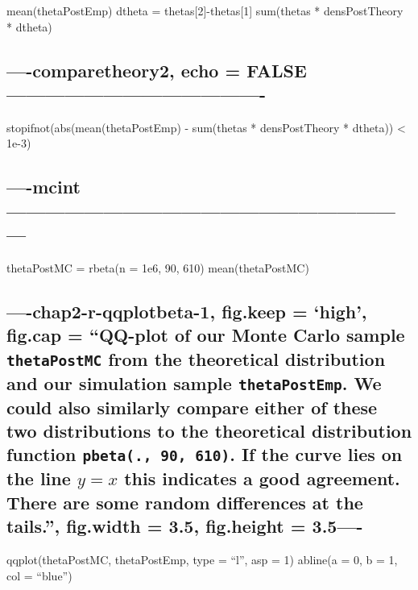 \documentclass[]{article}
\begin{document}
mean(thetaPostEmp) dtheta = thetas{[}2{]}-thetas{[}1{]} sum(thetas *
densPostTheory * dtheta)

\subsection{----comparetheory2, echo =
FALSE----------------------------------------}\label{comparetheory2-echo-false-}

stopifnot(abs(mean(thetaPostEmp) - sum(thetas * densPostTheory *
dtheta)) \textless{} 1e-3)

\subsection{----mcint---------------------------------------------------------------}\label{mcint}

thetaPostMC = rbeta(n = 1e6, 90, 610) mean(thetaPostMC)

\subsection{\texorpdfstring{----chap2-r-qqplotbeta-1, fig.keep = `high',
fig.cap = ``QQ-plot of our Monte Carlo sample \texttt{thetaPostMC} from
the theoretical distribution and our simulation sample
\texttt{thetaPostEmp}. We could also similarly compare either of these
two distributions to the theoretical distribution function
\texttt{pbeta(.,\ 90,\ 610)}. If the curve lies on the line \(y=x\) this
indicates a good agreement. There are some random differences at the
tails.'', fig.width = 3.5, fig.height =
3.5----}{----chap2-r-qqplotbeta-1, fig.keep = high, fig.cap = QQ-plot of our Monte Carlo sample thetaPostMC from the theoretical distribution and our simulation sample thetaPostEmp. We could also similarly compare either of these two distributions to the theoretical distribution function pbeta(., 90, 610). If the curve lies on the line y=x this indicates a good agreement. There are some random differences at the tails., fig.width = 3.5, fig.height = 3.5----}}\label{chap2-r-qqplotbeta-1-fig.keep-high-fig.cap-qq-plot-of-our-monte-carlo-sample-thetapostmc-from-the-theoretical-distribution-and-our-simulation-sample-thetapostemp.-we-could-also-similarly-compare-either-of-these-two-distributions-to-the-theoretical-distribution-function-pbeta.-90-610.-if-the-curve-lies-on-the-line-yx-this-indicates-a-good-agreement.-there-are-some-random-differences-at-the-tails.-fig.width-3.5-fig.height-3.5-}

qqplot(thetaPostMC, thetaPostEmp, type = ``l'', asp = 1) abline(a = 0, b
= 1, col = ``blue'')
\end{document}
